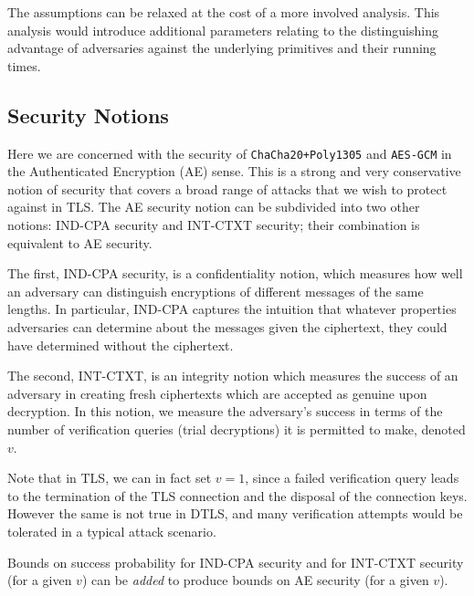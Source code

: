 \documentclass{article}
\begin{document}
The assumptions can be relaxed at the cost of a more involved analysis. This analysis would introduce additional parameters relating to the distinguishing advantage of adversaries against the underlying primitives and their running times. 

\subsection{Security Notions}

Here we are concerned with the security of \texttt{ChaCha20+Poly1305} and  \texttt{AES-GCM} in the Authenticated Encryption (AE) sense. This is a strong and very conservative notion of security that covers a broad range of attacks that we wish to protect against in TLS. The AE security notion can be subdivided into two other notions: IND-CPA security and INT-CTXT security; their combination is equivalent to AE security. 

The first, IND-CPA security, is a confidentiality notion, which measures how well an adversary can distinguish encryptions of different messages of the same lengths. In particular, IND-CPA captures the intuition that whatever properties adversaries can determine about the messages given the ciphertext, they could have determined without the ciphertext.

The second, INT-CTXT, is an integrity notion which measures the success of an adversary in creating fresh ciphertexts which are accepted as genuine upon decryption. In this notion, we measure the adversary's success in terms of the number of verification queries (trial decryptions) it is permitted to make, denoted $v$. 

Note that in TLS, we can in fact set $v=1$, since a failed verification query leads to the termination of the TLS connection and the disposal of the connection keys. However the same is not true in DTLS, and many verification attempts would be tolerated in a typical attack scenario. 

Bounds on success probability for IND-CPA security and for INT-CTXT security (for a given $v$) can be \emph{added} to produce bounds on AE security (for a given $v$).
\end{document}
